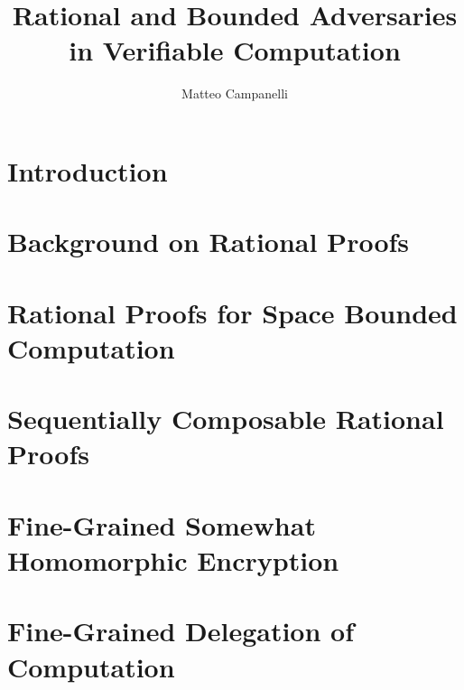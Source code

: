 \documentclass{tufte-book}
\title{Rational and Bounded Adversaries in Verifiable Computation}
\author{Matteo Campanelli}
\date{}
\begin{document}
\maketitle


\tableofcontents





\chapter{Introduction}




\chapter{Background on Rational Proofs}




\chapter{Rational Proofs for Space Bounded Computation}




\chapter{Sequentially Composable Rational Proofs}



\chapter{Fine-Grained Somewhat Homomorphic Encryption}



\chapter{Fine-Grained Delegation of Computation}








\end{document}
